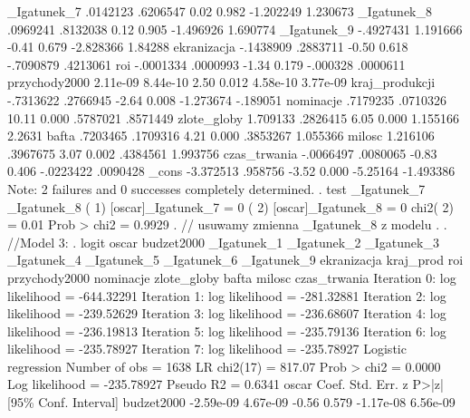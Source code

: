 \begin{stlog}
   _Igatunek_7 {\VBAR}   .0142123   .6206547     0.02   0.982    -1.202249    1.230673
   _Igatunek_8 {\VBAR}   .0969241   .8132038     0.12   0.905    -1.496926    1.690774
   _Igatunek_9 {\VBAR}  -.4927431   1.191666    -0.41   0.679    -2.828366     1.84288
   ekranizacja {\VBAR}  -.1438909   .2883711    -0.50   0.618    -.7090879    .4213061
           roi {\VBAR}  -.0001334   .0000993    -1.34   0.179     -.000328    .0000611
 przychody2000 {\VBAR}   2.11e-09   8.44e-10     2.50   0.012     4.58e-10    3.77e-09
kraj_produkcji {\VBAR}  -.7313622   .2766945    -2.64   0.008    -1.273674    -.189051
     nominacje {\VBAR}   .7179235   .0710326    10.11   0.000     .5787021    .8571449
   zlote_globy {\VBAR}   1.709133   .2826415     6.05   0.000     1.155166      2.2631
         bafta {\VBAR}   .7203465   .1709316     4.21   0.000     .3853267    1.055366
        milosc {\VBAR}   1.216106   .3967675     3.07   0.002     .4384561    1.993756
  czas_trwania {\VBAR}  -.0066497   .0080065    -0.83   0.406    -.0223422    .0090428
         _cons {\VBAR}  -3.372513    .958756    -3.52   0.000     -5.25164   -1.493386
Note: 2 failures and 0 successes completely determined.
{\smallskip}
. test _Igatunek_7 _Igatunek_8 
{\smallskip}
 ( 1)  [oscar]_Igatunek_7 = 0
 ( 2)  [oscar]_Igatunek_8 = 0
{\smallskip}
           chi2(  2) =    0.01
         Prob > chi2 =    0.9929
{\smallskip}
. // usuwamy zmienna _Igatunek_8 z modelu
. 
. //Model 3:
. logit oscar  budzet2000 _Igatunek_1 _Igatunek_2 _Igatunek_3 _Igatunek_4 _Igatunek_5 _Igatunek_6 _Igatunek_9
 ekranizacja kraj_prod roi przychody2000 nominacje zlote_globy bafta milosc czas_trwania
{\smallskip}
Iteration 0:   log likelihood = -644.32291  
Iteration 1:   log likelihood = -281.32881  
Iteration 2:   log likelihood = -239.52629  
Iteration 3:   log likelihood = -236.68607  
Iteration 4:   log likelihood = -236.19813  
Iteration 5:   log likelihood = -235.79136  
Iteration 6:   log likelihood = -235.78927  
Iteration 7:   log likelihood = -235.78927  
{\smallskip}
Logistic regression                               Number of obs   =       1638
                                                  LR chi2(17)     =     817.07
                                                  Prob > chi2     =     0.0000
Log likelihood = -235.78927                       Pseudo R2       =     0.6341
{\smallskip}
         oscar {\VBAR}      Coef.   Std. Err.      z    P>|z|     [95\% Conf. Interval]
    budzet2000 {\VBAR}  -2.59e-09   4.67e-09    -0.56   0.579    -1.17e-08    6.56e-09

\end{stlog}
